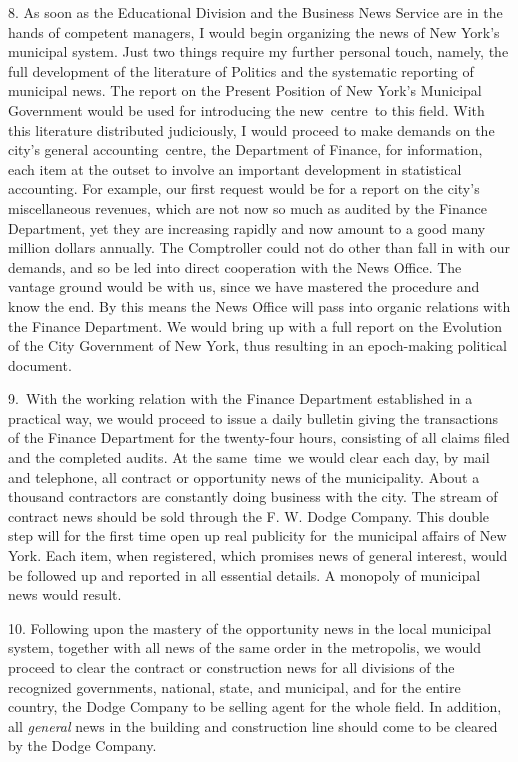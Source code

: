 \documentclass[twoside,symmetric,nobib,justified]{tufte-book}
\begin{document}
8. As soon as the Educational Division and the Business News Service are
in the hands of competent managers, I would begin organizing the news of
New York's municipal system. Just two things require my further personal
touch, namely, the full development of the literature of Politics and
the systematic reporting of municipal news. The report on the Present
Position of New York's Municipal Government would be used for
introducing the new~centre~to this field. With this literature
distributed judiciously, I would proceed to make demands on the city's
general accounting~centre, the Department of Finance, for information,
each item at the outset to involve an important development in
statistical accounting. For example, our first request would be for a
report on the city's miscellaneous revenues, which are not now so much
as audited by the Finance Department, yet they are increasing rapidly
and now amount to a good many million dollars annually. The Comptroller
could not do other than fall in with our demands, and so be led into
direct cooperation with the News Office. The vantage ground would be
with us, since we have mastered the procedure and know the end. By this
means the News Office will pass into organic relations with the Finance
Department. We would bring up with a full report on the Evolution of the
City Government of New York, thus resulting in an epoch-making political
document.~

9.~With the working relation with the Finance Department established in
a practical way, we would proceed to issue a daily bulletin giving the
transactions of the Finance Department for the twenty-four hours,
consisting of all claims filed and the completed audits. At the
same~time~we would clear each day, by mail and telephone, all contract
or opportunity news of the municipality. About a thousand contractors
are constantly doing business with the city. The stream of contract news
should be sold through the F. W. Dodge Company. This double step will
for the first time open up real publicity for~the municipal affairs of
New York. Each item, when registered, which promises news of general
interest, would be followed up and reported in all essential details. A
monopoly of municipal news would result.~

10. Following upon the mastery of the opportunity news in the local
municipal system, together with all news of the same order in the
metropolis, we would proceed to clear the contract or construction news
for all divisions of the recognized governments, national, state, and
municipal, and for the entire country, the Dodge Company to be selling
agent for the whole field. In addition, all \emph{general} news in the
building and construction line should come to be cleared by the Dodge
Company.~
\end{document}
